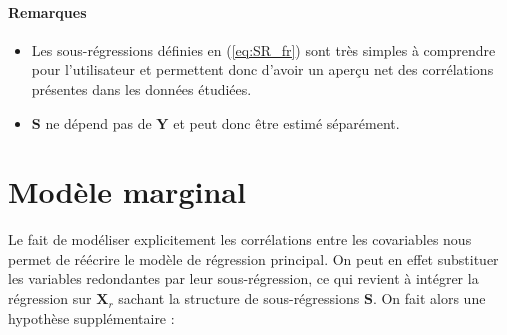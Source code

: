 \documentclass[12pt,a4paper]{report}
\begin{document}
	\paragraph{Remarques}
\begin{itemize}
\item Les sous-régressions définies en (\ref{eq:SR_fr}) sont très simples à comprendre pour l'utilisateur et permettent donc d'avoir un aperçu net des corrélations présentes dans les données étudiées.
\item $\boldsymbol{S}$ ne dépend pas de $\boldsymbol{Y}$ et peut donc être estimé séparément.
\end{itemize} 
	\section{Modèle marginal}
	Le fait de modéliser explicitement les corrélations entre les covariables nous permet de réécrire le modèle de régression principal. On peut en effet substituer les variables redondantes par leur sous-régression, ce qui revient à intégrer la régression sur $\boldsymbol{X}_{r}$ sachant la structure de sous-régressions $\boldsymbol{S}$. On fait alors une hypothèse supplémentaire :
\end{document}
